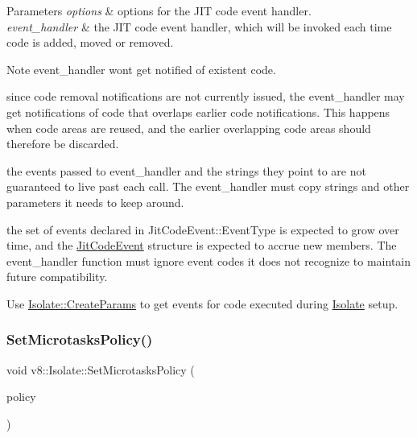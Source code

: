 \begin{DoxyParams}{Parameters}
{\em options} & options for the J\+IT code event handler. \\
\hline
{\em event\+\_\+handler} & the J\+IT code event handler, which will be invoked each time code is added, moved or removed. \\
\hline
\end{DoxyParams}
\begin{DoxyNote}{Note}
{\ttfamily event\+\_\+handler} won\textquotesingle{}t get notified of existent code. 

since code removal notifications are not currently issued, the {\ttfamily event\+\_\+handler} may get notifications of code that overlaps earlier code notifications. This happens when code areas are reused, and the earlier overlapping code areas should therefore be discarded. 

the events passed to {\ttfamily event\+\_\+handler} and the strings they point to are not guaranteed to live past each call. The {\ttfamily event\+\_\+handler} must copy strings and other parameters it needs to keep around. 

the set of events declared in Jit\+Code\+Event\+::\+Event\+Type is expected to grow over time, and the \mbox{\hyperlink{structv8_1_1JitCodeEvent}{Jit\+Code\+Event}} structure is expected to accrue new members. The {\ttfamily event\+\_\+handler} function must ignore event codes it does not recognize to maintain future compatibility. 

Use \mbox{\hyperlink{structv8_1_1Isolate_1_1CreateParams}{Isolate\+::\+Create\+Params}} to get events for code executed during \mbox{\hyperlink{classv8_1_1Isolate}{Isolate}} setup. 
\end{DoxyNote}
\mbox{\label{classv8_1_1Isolate_a6bc2069413d88ad90e4c8bee0b9e4037}} 
\subsubsection{\texorpdfstring{Set\+Microtasks\+Policy()}{SetMicrotasksPolicy()}}
{\footnotesize\ttfamily void v8\+::\+Isolate\+::\+Set\+Microtasks\+Policy (\begin{DoxyParamCaption}\item[{\mbox{\hyperlink{namespacev8_a2f183b102b3d1b7a30a805e8c53c04da}{Microtasks\+Policy}}}]{policy }\end{DoxyParamCaption})}

